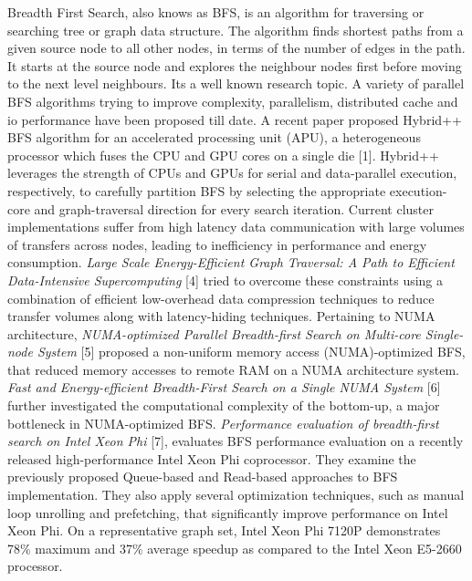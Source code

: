 Breadth First Search, also knows as BFS, is an algorithm for traversing
or searching tree or graph data structure. The algorithm finds shortest paths
from a given source node to all other nodes, in
terms of the number of edges in the path. It starts at the source node and
explores the neighbour nodes first before moving to the next level neighbours.
Its a well known research topic. A variety of parallel BFS algorithms trying to
improve complexity, parallelism, distributed cache and io performance have been
proposed till date.\newline
A recent paper proposed Hybrid++ BFS algorithm for an accelerated processing
unit (APU), a heterogeneous processor which fuses the CPU and GPU cores on a
single die [1]. Hybrid++ leverages the strength of CPUs and GPUs for serial and
data-parallel execution, respectively, to carefully partition BFS by selecting
the appropriate execution-core and graph-traversal direction for every search
iteration.\newline
Current cluster implementations suffer from high latency data communication
with large volumes of transfers across nodes, leading to inefficiency in
performance and energy consumption. \emph{Large Scale Energy-Efficient Graph
Traversal: A Path to Efficient Data-Intensive Supercomputing} [4] tried to
overcome these constraints using a combination of efficient low-overhead data
compression techniques to reduce transfer volumes along with latency-hiding
techniques.\newline
Pertaining to NUMA architecture, \emph{NUMA-optimized Parallel Breadth-first
Search on Multi-core Single-node System} [5] proposed a non-uniform memory
access (NUMA)-optimized BFS, that reduced memory accesses to remote RAM on a
NUMA architecture system. \emph{Fast and Energy-efficient Breadth-First Search
on a Single NUMA System} [6] further investigated the computational
complexity of the bottom-up, a major bottleneck in NUMA-optimized BFS.\newline
\emph{Performance evaluation of breadth-first search on Intel Xeon Phi} [7],
evaluates BFS performance evaluation on a recently released high-performance
Intel Xeon Phi coprocessor. They examine the previously proposed Queue-based
and Read-based approaches to BFS implementation. They also apply several
optimization techniques, such as manual loop unrolling and prefetching, that
significantly improve performance on Intel Xeon Phi. On a representative graph
set, Intel Xeon Phi 7120P demonstrates 78\% maximum and 37\% average speedup as
compared to the Intel Xeon E5-2660 processor.



